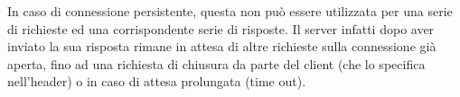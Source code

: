 In caso di connessione persistente, questa non può essere utilizzata per una serie di richieste ed una corrispondente serie di risposte. Il server infatti dopo aver inviato la sua risposta rimane in attesa di altre richieste sulla connessione già aperta, fino ad una richiesta di chiusura da parte del client (che lo specifica nell'header) o in caso di attesa prolungata (time out).